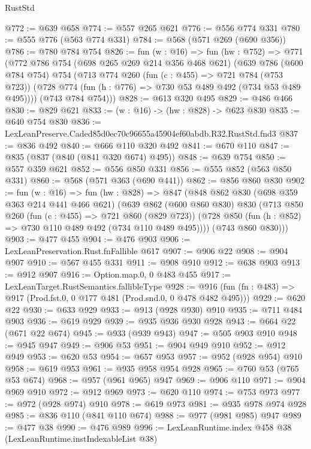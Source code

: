 \begin{lexlean}{RustStd}
\begin{coremodule}
@772 := @639 @658
@774 := @557 @265 @621
@776 := @556 @774 @331
@780 := @555 @776 (@563 @774 @331)
@784 := @568 (@571 @269 (@690 @356))
@786 := @780 @784 @754
@826 := fun (w : @16) =>
  fun (hw : @752) =>
  @771
    (@772
      @786
      @754
      (@698 @265 @269 @214 @356 @468 @621)
      (@639
        @786
        (@600 @784 @754)
        @754
        (@713
          @774
          @260
          (fun (c : @455) => @721 @784 (@753 @723))
          (@728 @774 (fun (h : @776) => @730 @53 @489 @492 (@734 @53 @489 @495))))
        (@743 @784 @754)))
@828 := @613 @320 @495
@829 := @486 @466
@830 := @829 @621
@833 := (w : @16) -> (hw : @828) -> @623 @830
@835 := @640 @754 @830
@836 := LexLeanPreserve.Caded85d0ec70c96655a45904ef60abdb.R32.RustStd.fnd3
@837 := @836 @492
@840 := @666 @110 @320 @492
@841 := @670 @110
@847 := @835 (@837 (@840 (@841 @320 @674) @495))
@848 := @639 @754
@850 := @557 @359 @621
@852 := @556 @850 @331
@856 := @555 @852 (@563 @850 @331)
@860 := @568 (@571 @363 (@690 @441))
@862 := @856 @860 @830
@902 := fun (w : @16) =>
  fun (hw : @828) =>
  @847
    (@848
      @862
      @830
      (@698 @359 @363 @214 @441 @466 @621)
      (@639
        @862
        (@600 @860 @830)
        @830
        (@713
          @850
          @260
          (fun (c : @455) => @721 @860 (@829 @723))
          (@728 @850 (fun (h : @852) => @730 @110 @489 @492 (@734 @110 @489 @495))))
        (@743 @860 @830)))
@903 := @477 @455
@904 := @476 @903
@906 := LexLeanPreservation.Rust.fnFallible @617
@907 := @906 @22
@908 := @904 @907
@910 := @567 @455 @331
@911 := @908 @910
@912 := @638 @903
@913 := @912 @907
@916 := Option.map.{0, 0} @483 @455
@917 := LexLeanTarget.RustSemantics.fallibleType
@928 := @916 (fun (fn : @483) => @917 (Prod.fst.{0, 0} @177 @481 (Prod.snd.{0, 0} @478 @482 @495)))
@929 := @620 @22
@930 := @633 @929
@933 := @913 (@928 @930) @910
@935 := @711 @484 @903
@936 := @619 @929
@939 := @935 @936 @930 @928
@943 := @664 @22 (@671 @22 @674)
@945 := @933 (@939 @943)
@947 := @505 @903 @910
@948 := @945 @947
@949 := @906 @53
@951 := @904 @949 @910
@952 := @912 @949
@953 := @620 @53
@954 := @657 @953
@957 := @952 (@928 @954) @910
@958 := @619 @953
@961 := @935 @958 @954 @928
@965 := @760 @53 (@765 @53 @674)
@968 := @957 (@961 @965) @947
@969 := @906 @110
@971 := @904 @969 @910
@972 := @912 @969
@973 := @620 @110
@974 := @753 @973
@977 := @972 (@928 @974) @910
@978 := @619 @973
@981 := @935 @978 @974 @928
@985 := @836 @110 (@841 @110 @674)
@988 := @977 (@981 @985) @947
@989 := @477 @38
@990 := @476 @989
@996 := LexLeanRuntime.index @458 @38 (LexLeanRuntime.instIndexableList @38)

\end{coremodule}
\end{lexlean}
